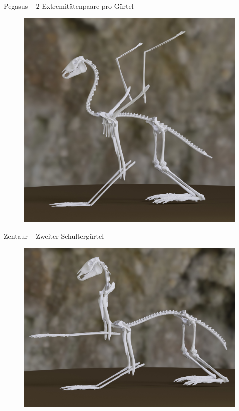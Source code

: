 \documentclass{beamer}
\begin{document}
\begin{frame}[focus]
 \begin{flushleft}
  \Large Pegasus -- $2$ Extremitätenpaare pro Gürtel
 \end{flushleft}
 \vfill
 \begin{figure}
  \centering
  \includegraphics[height=0.75\textheight]{../../java_skeleton_generation/example_skeletons/pegasus.jpg}
 \end{figure}
\end{frame}

\begin{frame}[focus]
 \begin{flushleft}
  \Large Zentaur -- Zweiter Schultergürtel
 \end{flushleft}
 \vfill
 \begin{figure}
  \centering
  \includegraphics[height=0.75\textheight]{../../java_skeleton_generation/example_skeletons/zentaur2.jpg}
 \end{figure}
\end{frame}
\end{document}
